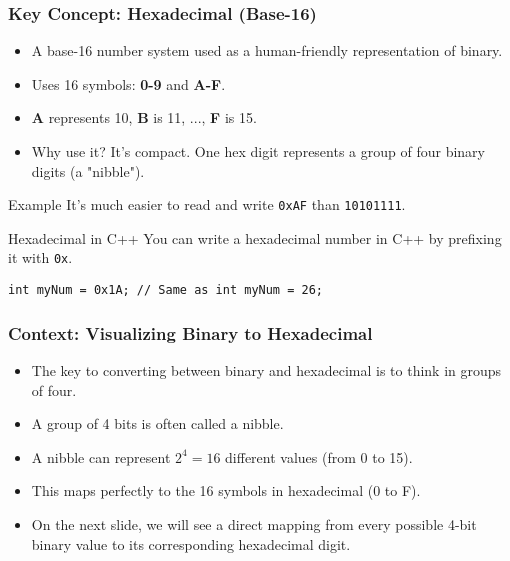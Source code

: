 \documentclass{beamer}
\begin{document}
\begin{frame}
\frametitle{Key Concept: Hexadecimal (Base-16)}
\begin{itemize}
    \item A base-16 number system used as a \alert{human-friendly representation} of binary.
    \item Uses 16 symbols: \textbf{0-9} and \textbf{A-F}.
    \item \textbf{A} represents 10, \textbf{B} is 11, ..., \textbf{F} is 15.
    \item Why use it? It's compact. One hex digit represents a group of four binary digits (a "nibble").
\end{itemize}

\begin{exampleblock}{Example}
It's much easier to read and write \texttt{0xAF} than \texttt{10101111}.
\end{exampleblock}

\begin{alertblock}{Hexadecimal in C++}
You can write a hexadecimal number in C++ by prefixing it with \texttt{0x}.
\end{alertblock}
\texttt{int myNum = 0x1A; // Same as int myNum = 26;}
\end{frame}

\begin{frame}
\frametitle{Context: Visualizing Binary to Hexadecimal}
\begin{itemize}
    \item The key to converting between binary and hexadecimal is to think in groups of four.
    \item A group of 4 bits is often called a \alert{nibble}.
    \item A nibble can represent $2^4 = 16$ different values (from 0 to 15).
    \item This maps perfectly to the 16 symbols in hexadecimal (0 to F).
    \item On the next slide, we will see a direct mapping from every possible 4-bit binary value to its corresponding hexadecimal digit.
\end{itemize}
\end{frame}
\end{document}
